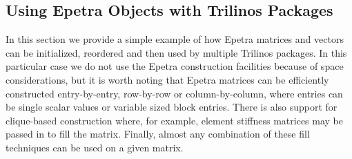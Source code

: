 \documentclass[acmtoms,acmnow]{acmtrans2m}
\begin{document}
%
%

\subsection{Using Epetra Objects with Trilinos Packages}

In this section we provide a simple example of how Epetra matrices and
vectors can be initialized, reordered and then used by multiple
Trilinos packages.  In this particular case we do not use the Epetra
construction facilities because of space considerations, but it is
worth noting that Epetra matrices can be efficiently constructed
entry-by-entry, row-by-row or column-by-column, where entries can be
single scalar values or variable sized block entries.  There is also
support for clique-based construction where, for example, element
stiffness matrices may be passed in to fill the matrix.  Finally,
almost any combination of these fill techniques can be used on a given
matrix.
\end{document}
